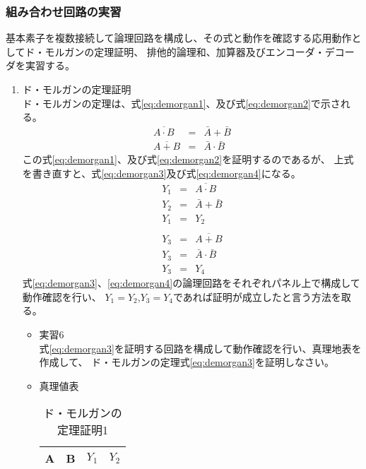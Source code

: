 \documentclass[dvipdfmx,a4paper]{jsarticle}
\begin{document}
			\subsubsection{組み合わせ回路の実習}
				基本素子を複数接続して論理回路を構成し、その式と動作を確認する応用動作としてド・モルガンの定理証明、
				排他的論理和、加算器及びエンコーダ・デコーダを実習する。
				\begin{enumerate}
					\item ド・モルガンの定理証明 \\
						ド・モルガンの定理は、式\ref{eq:demorgan1}、及び式\ref{eq:demorgan2}で示される。
						\begin{eqnarray}
							\label{eq:demorgan1}
							\overline{A \cdot B} &=& \bar{A} + \bar{B} \\
							\label{eq:demorgan2}
							\overline{A + B} &=& \bar{A} \cdot \bar{B}
						\end{eqnarray}
						この式\ref{eq:demorgan1}、及び式\ref{eq:demorgan2}を証明するのであるが、
						上式を書き直すと、式\ref{eq:demorgan3}及び式\ref{eq:demorgan4}になる。
						\begin{eqnarray}
							\label{eq:demorgan3}
							Y_1 &=& \overline{A \cdot B} \\
							Y_2 &=& \bar{A} + \bar{B} \\
							Y_1 &=& Y_2 \\
						\end{eqnarray}
						\begin{eqnarray}
							\label{eq:demorgan4}
							Y_3 &=& \overline{A + B} \\
							Y_3 &=& \bar{A} \cdot \bar{B} \\
							Y_3 &=& Y_4
						\end{eqnarray}
						式\ref{eq:demorgan3}、\ref{eq:demorgan4}の論理回路をそれぞれパネル上で構成して動作確認を行い、
						$Y_1=Y_2$,$Y_3=Y_4$であれば証明が成立したと言う方法を取る。
						\begin{itemize}
							\item 実習6 \\
								式\ref{eq:demorgan3}を証明する回路を構成して動作確認を行い、真理地表を作成して、
								ド・モルガンの定理式\ref{eq:demorgan3}を証明しなさい。
							\item 真理値表
								\begin{table}[H]
									\center
									\caption{ド・モルガンの定理証明1 \label{tb:demorgan1}}
									\begin{tabular}{|c|c|c|c|}
										\hline
										A & B & $Y_1$ &$Y_2$ \\ \hline

\end{tabular}
\end{table}
\end{itemize}
\end{enumerate}
\end{document}
